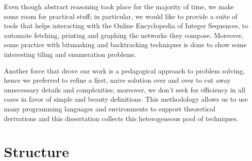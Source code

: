 Even though abstract reasoning took place for the majority of time, we make
some room for practical stuff; in particular, we would like to provide a suite
of tools that helps interacting with the Online Encyclopedia of Integer
Sequences, to automate fetching, printing and graphing the networks they
compose. Moreover, some practice with bitmasking and backtracking techniques is
done to show some interesting tiling and enumeration problems.

Another force that drove our work is a pedagogical approach to problem solving,
hence we preferred to refine a first, naive solution over and over to cut away
unnecessary details and complexities; moreover, we don't seek for efficiency in
all cases in favor of simple and beauty definitions. This methodology allows us
to use many programming languages and environments to support theoretical
derivations and this dissertation collects this heterogeneous pool of techniques.


\section*{Structure}

